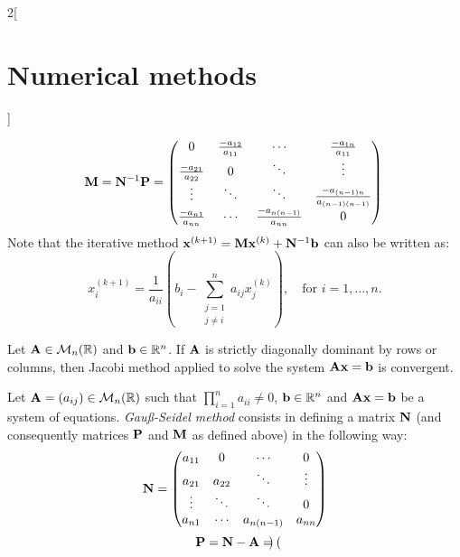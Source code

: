 \documentclass[../../../main.tex]{subfiles}
\begin{document}
\begin{multicols}{2}[\section{Numerical methods}]
\begin{definition}
\begin{equation*}
        \vb{M}=\vb{N}^{-1}\vb{P}=
        \begin{pmatrix}
            0 & \frac{-a_{12}}{a_{11}} & \cdots & \frac{-a_{1n}}{a_{11}}\\
            \frac{-a_{21}}{a_{22}} & 0 & \ddots & \vdots\\
            \vdots & \ddots & \ddots & \frac{-a_{(n-1)n}}{a_{(n-1)(n-1)}}\\
            \frac{-a_{n1}}{a_{nn}} & \cdots & \frac{-a_{n(n-1)}}{a_{nn}} & 0
        \end{pmatrix}\\
    \end{equation*}
    Note that the iterative method $\vb{x}^{(k+1)}=\vb{M}\vb{x}^{(k)}+\vb{N}^{-1}\vb{b}$ can also be written as: $$x_i^{(k+1)}=\frac{1}{a_{ii}}\left(b_i-\sum_{\substack{j=1\\j\ne i}}^na_{ij}x_j^{(k)}\right),\quad\text{for }i=1,\ldots,n.$$
\end{definition}
\begin{theorem}
    Let $\vb{A}\in\mathcal{M}_n(\mathbb{R})$ and $\vb{b}\in\mathbb{R}^n$. If $\vb{A}$ is strictly diagonally dominant by rows or columns, then Jacobi method applied to solve the system $\vb{A}\vb{x}=\vb{b}$ is convergent.
\end{theorem}
\begin{definition}
    Let $\vb{A}=(a_{ij})\in\mathcal{M}_n(\mathbb{R})$ such that $\prod_{i=1}^na_{ii}\ne 0$, $\vb{b}\in\mathbb{R}^n$ and $\vb{A}\vb{x}=\vb{b}$ be a system of equations. \textit{Gau\ss-Seidel method} consists in defining a matrix $\vb{N}$ (and consequently matrices $\vb{P}$ and $\vb{M}$ as defined above) in the following way:
    \begin{equation*}
        \vb{N}=
        \begin{pmatrix}
            a_{11} & 0 & \cdots & 0\\
            a_{21} & a_{22} & \ddots & \vdots\\
            \vdots & \ddots & \ddots & 0\\
            a_{n1} & \cdots & a_{n(n-1)} & a_{nn}
        \end{pmatrix}
    \end{equation*}
    \begin{equation*}
        \vb{P}=\vb{N}-\vb{A}=
        \begin{pmatrix}

\end{pmatrix}
\end{equation*}
\end{definition}
\end{multicols}
\end{document}
